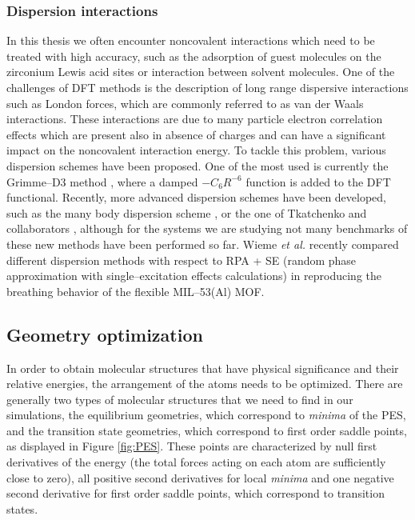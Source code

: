 \subsubsection*{Dispersion interactions}
In this thesis we often encounter noncovalent interactions which need to be treated with high accuracy, such as the adsorption of guest molecules on the zirconium Lewis acid sites or interaction between solvent molecules. One of the challenges of DFT methods is the description of long range dispersive interactions such as London forces, which are commonly referred to as van der Waals interactions. These interactions are due to many particle electron correlation effects which are present also in absence of charges and can have a significant impact on the noncovalent interaction energy. 
To tackle this problem, various dispersion schemes have been proposed. One of the most used is currently the Grimme--D3 method \cite{Grimme2010}, where a damped $-C_{6}R^{-6}$ function is added to the DFT functional. Recently, more advanced dispersion schemes have been developed, such as the many body dispersion scheme \cite{Buko2016}, or the one of Tkatchenko and collaborators \cite{Ambrosetti2014}, although for the systems we are studying not many benchmarks of these new methods have been performed so far. 
Wieme \textit{et al.} \cite{wieme2018tuning} recently compared different dispersion methods with respect to RPA + SE (random phase approximation with single--excitation effects calculations) in reproducing the breathing behavior of the flexible MIL--53(Al) MOF. 

\subsection*{Geometry optimization}
In order to obtain molecular structures that have physical significance and their relative energies, the arrangement of the atoms needs to be optimized. There are generally two types of molecular structures that we need to find in our simulations, the equilibrium geometries, which correspond to \textit{minima} of the PES, and the transition state geometries, which correspond to first order saddle points, as displayed in Figure \ref{fig:PES}. These points are characterized by null first derivatives of the energy (the total forces acting on each atom are sufficiently close to zero), all positive second derivatives for local \textit{minima} and one negative second derivative for first order saddle points, which correspond to transition states. 

